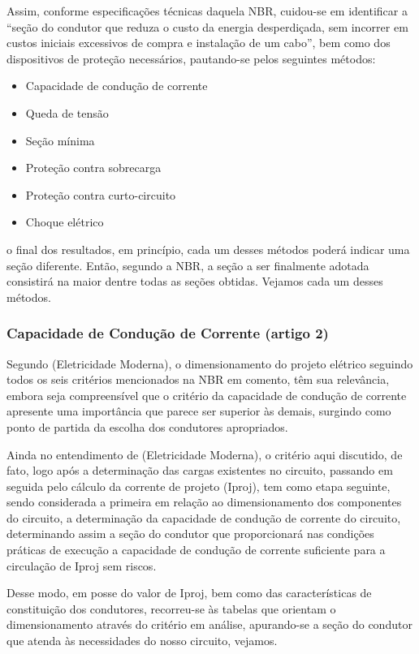 Assim, conforme especificações técnicas daquela NBR, cuidou-se em identificar a “seção do condutor que reduza o custo da energia desperdiçada, sem incorrer em custos iniciais excessivos de compra e instalação de um cabo”, bem como dos dispositivos de proteção necessários, pautando-se pelos seguintes métodos:

\begin{itemize}
	\item Capacidade de condução de corrente
	\item Queda de tensão
	\item Seção mínima
	\item Proteção contra sobrecarga
	\item Proteção contra curto-circuito
	\item Choque elétrico
\end{itemize}

o final dos resultados, em princípio, cada um desses métodos poderá indicar uma seção diferente. Então, segundo a NBR, a seção a ser finalmente adotada consistirá na maior dentre todas as seções obtidas. Vejamos cada um desses métodos.

\subsubsection{Capacidade de Condução de Corrente (artigo 2)}

Segundo (Eletricidade Moderna), o dimensionamento do projeto elétrico seguindo todos os seis critérios mencionados na NBR em comento, têm sua relevância, embora seja compreensível que o critério da capacidade de condução de corrente apresente uma importância que parece ser superior às demais, surgindo como ponto de partida da escolha dos condutores apropriados.

Ainda no entendimento de (Eletricidade Moderna), o critério aqui discutido, de fato, logo após a determinação das cargas existentes no circuito, passando em seguida pelo cálculo da corrente de projeto (Iproj), tem como etapa seguinte, sendo considerada a primeira em relação ao dimensionamento dos componentes do circuito, a determinação da capacidade de condução de corrente do circuito, determinando assim a seção do condutor que proporcionará nas condições práticas de execução a capacidade de condução de corrente suficiente para a circulação de Iproj sem riscos.

Desse modo, em posse do valor de Iproj, bem como das características de constituição dos condutores, recorreu-se às tabelas que orientam o dimensionamento através do critério em análise, apurando-se a seção do condutor que atenda às necessidades do nosso circuito, vejamos.

